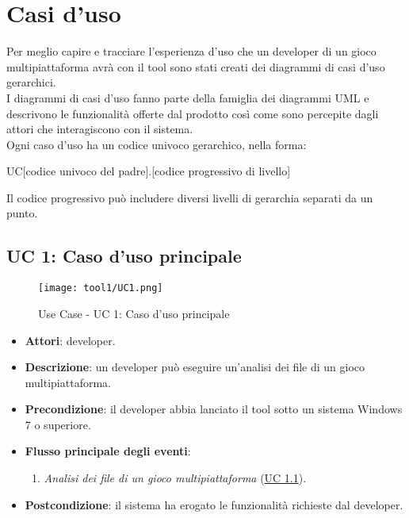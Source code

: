 \section{Casi d'uso}

	Per meglio capire e tracciare l'esperienza d'uso che un developer di un gioco multipiattaforma avrà con il tool sono stati creati dei diagrammi di casi d'uso gerarchici.\\
	I diagrammi di casi d'uso fanno parte della famiglia dei diagrammi UML e descrivono le funzionalità offerte dal prodotto così come sono percepite dagli attori che interagiscono con il sistema.\\
	Ogni caso d'uso ha un codice univoco gerarchico, nella forma:
	\begin{center} 
		UC[codice univoco del padre].[codice progressivo di livello]
	\end{center}
	\paragrafo Il codice progressivo può includere diversi livelli di gerarchia separati da un punto.
	
	\subsection{UC 1: Caso d'uso principale}
		\label{subsec:UC1}
	
		\begin{figure}[h!] 
			\centering 
			\texttt{[image: tool1/UC1.png]} 
			\caption{Use Case - UC 1: Caso d'uso principale}
		\end{figure}
		
		\begin{itemize}
			\item\textbf{Attori}: developer.
			\item\textbf{Descrizione}: un developer può eseguire un'analisi dei file di un gioco multipiattaforma.
			\item\textbf{Precondizione}: il developer abbia lanciato il tool sotto un sistema Windows 7 o superiore.
			\item\textbf{Flusso principale degli eventi}: 
			\begin{enumerate}
				\item\textit{Analisi dei file di un gioco multipiattaforma} (\hyperref[subsec:UC1.1]{UC 1.1}).
			\end{enumerate}
			\item\textbf{Postcondizione}: il sistema ha erogato le funzionalità richieste dal developer.
		\end{itemize}
		
